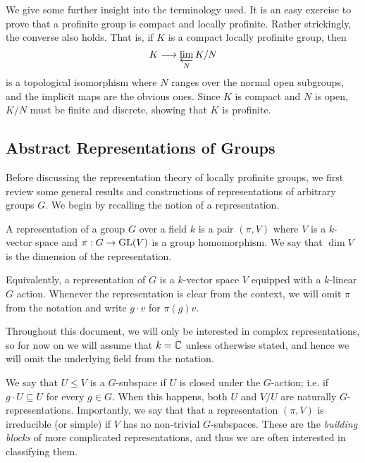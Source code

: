 \begin{examples}
\begin{enumerate}
    \end{enumerate}
\end{examples}

We give some further insight into the terminology used. It is an easy exercise to prove that a profinite group is compact and locally profinite. Rather strickingly, the converse also holds. That is, if $K$ is a compact locally profinite group, then
$$K\longrightarrow\varprojlim_N K/N$$
is a topological isomorphism where $N$ ranges over the normal open subgroups, and the implicit maps are the obvious ones. Since $K$ is compact and $N$ is open, $K/N$ must be finite and discrete, showing that $K$ is profinite.

\subsection{Abstract Representations of Groups} \label{Abstract_Reps}
Before discussing the representation theory of locally profinite groups, we first review some general results and constructions of representations of arbitrary groups $G$. We begin by recalling the notion of a representation.

\begin{defn}
    A representation of a group $G$ over a field $k$ is a pair $(\pi,V)$ where $V$ is a $k$-vector space and $\pi:G\rightarrow\mathrm{GL}(V)$ is a group homomorphism. We say that $\dim V$ is the dimension of the representation.
\end{defn}

Equivalently, a representation of $G$ is a $k$-vector space $V$ equipped with a $k$-linear $G$ action. Whenever the representation is clear from the context, we will omit $\pi$ from the notation and write $g\cdot v$ for $\pi(g)v$. 

Throughout this document, we will only be interested in complex representations, so for now on we will assume that $k=\mathbb{C}$ unless otherwise stated, and hence we will omit the underlying field from the notation.

We say that $U\leq V$ is a $G$-subspace if $U$ is closed under the $G$-action; i.e. if $g\cdot U\subseteq U$ for every $g\in G$. When this happens, both $U$ and $V/U$ are naturally $G$-representations. Importantly, we say that that a representation $(\pi,V)$ is irreducible (or simple) if $V$ has no non-trivial $G$-subspaces. These are the \textit{building blocks} of more complicated representations, and thus we are often interested in classifying them.

